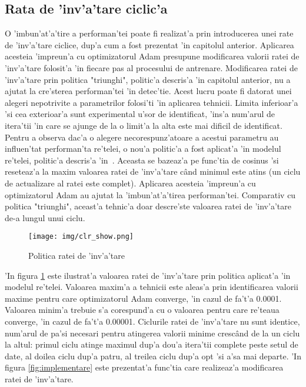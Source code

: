 \documentclass[12pt,a4paper,twoside]{report}
\begin{document}
\subsection{Rata de 'inv'a'tare ciclic'a}
O 'imbun'at'a'tire a performan'tei poate fi realizat'a prin introducerea unei rate de 'inv'a'tare ciclice, dup'a cum a fost prezentat 'in capitolul anterior. Aplicarea acesteia 'impreun'a cu optimizatorul Adam presupune modificarea valorii ratei de 'inv'a'tare folosit'a 'in fiecare pas al procesului de antrenare. Modificarea ratei de 'inv'a'tare prin politica "triunghi", politic'a descris'a 'in capitolul anterior, nu a ajutat la cre'sterea performan'tei 'in detec'tie. Acest lucru poate fi datorat unei alegeri nepotrivite a parametrilor folosi'ti 'in aplicarea tehnicii. Limita inferioar'a 'si cea exterioar'a sunt experimental u'sor de identificat, 'ins'a num'arul de itera'tii 'in care se ajunge de la o limit'a la alta este mai dificil de identificat. Pentru a observa dac'a o alegere necorespunz'atoare a acestui parametru au influen'tat performan'ta re'telei, o nou'a politic'a a fost aplicat'a 'in modelul re'telei, politic'a descris'a 'in~\cite{clr_cos}. Aceasta se bazeaz'a pe func'tia de cosinus 'si reseteaz'a la maxim valoarea ratei de 'inv'a'tare c\^and minimul este atins (un ciclu de actualizare al ratei este complet). Aplicarea acesteia 'impreun'a cu optimizatorul Adam au ajutat la 'imbun'at'a'tirea performan'tei. Comparativ cu politica "triunghi", aceast'a tehnic'a doar descre'ste valoarea ratei de 'inv'a'tare de-a lungul unui ciclu.

\begin{figure}[H]
  \centering
  \texttt{[image: img/clr\_show.png]}
  \caption{Politica ratei de 'inv'a'tare}
  \label{fig:clr_cosinus}
\end{figure}

'In figura \ref{fig:clr_cosinus} este ilustrat'a valoarea ratei de 'inv'a'tare prin politica aplicat'a 'in modelul re'telei. Valoarea maxim'a a tehnicii este aleas'a prin identificarea valorii maxime pentru care optimizatorul Adam converge, 'in cazul de fa't'a 0.0001. Valoarea minim'a trebuie s'a corespund'a cu o valoarea pentru care re'teaua converge, 'in cazul de fa't'a 0.00001. Ciclurile ratei de 'inv'a'tare nu sunt identice, num'arul de pa'si necesari pentru atingerea valorii minime cresc\^and de la un ciclu la altul: primul ciclu atinge maximul dup'a dou'a itera'tii complete peste setul de date, al doilea ciclu dup'a patru, al treilea ciclu dup'a opt 'si a'sa mai departe. 'In figura \ref{fig:implementare} este prezentat'a func'tia care realizeaz'a modificarea ratei de 'inv'a'tare.
\end{document}
